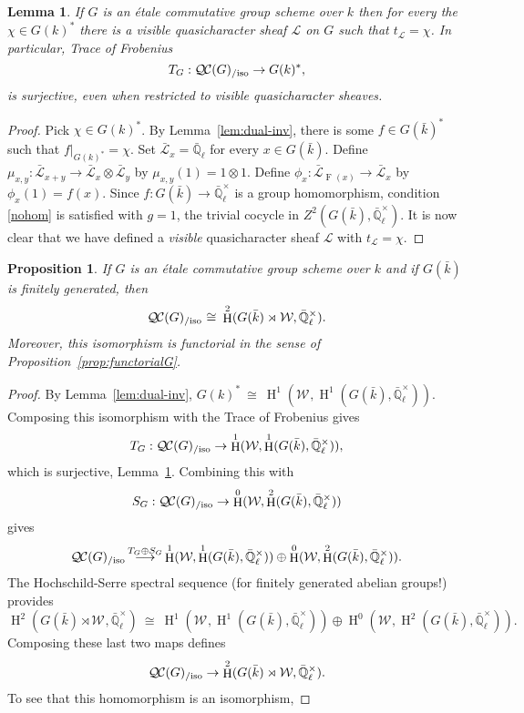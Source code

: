 \documentclass{amsart}
\theoremstyle{plain}
\newtheorem{proposition}[theorem]{Proposition}
\newtheorem{lemma}[theorem]{Lemma}
\theoremstyle{definition}
\theoremstyle{remark}
\newcommand{\EE}{\mathbb{\bar Q}_\ell}
\newcommand{\bFq}{\bar{k}}
\newcommand{\Fq}{k}
\newcommand{\EEx}{\EE^\times}
\newcommand{\Weil}[1]{\mathcal{W}_{#1}}
\newcommand{\Frob}[1]{\operatorname{F}_{#1}}
\DeclareMathOperator{\Hh}{H}
\newcommand{\iso}{{\ \cong\ }}
\newcommand{\qcs}[1]{{\mathcal{#1}}}
\newcommand{\gqcs}[1]{{\mathcal{\bar #1}}}
\newcommand{\QC}{{\mathcal{Q\hskip-0.8pt C}}}
\newcommand{\QCiso}[1]{\QC(#1)_{/\text{iso}}}
\newcommand{\trFrob}[1]{t_{#1}}
\newcommand{\TrFrob}[1]{T_{#1}}
\begin{document}
\begin{lemma}\label{lem:etale-trace}
If $G$ is an \'etale commutative group scheme over $\Fq$
then for every the $\chi \in G(\Fq)^*$ there is a visible quasicharacter sheaf $\qcs{L}$ on $G$ such that $\trFrob{\qcs{L}} = \chi$.
In particular, Trace of Frobenius
\[
\TrFrob{G} : \QCiso{G} \to G(\Fq)^*,
\]
is surjective, even when restricted to visible quasicharacter sheaves.
\end{lemma}

\begin{proof}
Pick $\chi \in G(\Fq)^*$.
By Lemma~\ref{lem:dual-inv}, there is some $f\in G(\bFq)^*$ such that $f\vert_{G(\Fq)^*} = \chi$.
Set $\gqcs{L}_x = \EE$ for every $x\in G(\bFq)$.
Define $\mu_{x,y} : \gqcs{L}_{x+y} \to \gqcs{L}_x\otimes \gqcs{L}_y$ by $\mu_{x,y}(1) = 1 \otimes 1$.
Define $\phi_{x} : \gqcs{L}_{\Frob{}(x)} \to \gqcs{L}_x$ by $\phi_{x}(1) = f(x)$.
Since $f : G(\bFq) \to \EEx$ is a group homomorphism,
condition \eqref{nohom} is satisfied with $g =1$, the trivial cocycle in $Z^2(G(\bFq),\EEx)$.
It is now clear that we have defined a \emph{visible} quasicharacter sheaf $\qcs{L}$ with $\trFrob{\qcs{L}} = \chi$.
\end{proof}


\begin{proposition} \label{prop:etale-iso}
	If $G$ is an \'etale commutative group scheme over $\Fq$
	and if $G(\bFq)$ is finitely generated,
  	then
  	\[
  	\QCiso{G} \iso \Hh^2(G(\bFq)\rtimes \Weil{}, \EEx).
  	\]
  	Moreover, this isomorphism is functorial
  	in the sense of Proposition~\ref{prop:functorialG}.
\end{proposition}

\begin{proof}
By Lemma~\ref{lem:dual-inv}, $G(\Fq)^* \iso \Hh^1(\Weil{},\Hh^1(G(\bFq),\EEx))$. Composing this isomorphism with the Trace of Frobenius gives
\[
T_{G}: \QCiso{G}\to  \Hh^1(\Weil{},\Hh^1(G(\bFq),\EEx)),
\]
which is surjective, Lemma~\ref{lem:etale-trace}.
Combining this with
\[
S_{G} : \QCiso{G} \to \Hh^0(\Weil{}, \Hh^2(G(\bFq),\EEx))
\]
gives
\[
\QCiso{G} \mathop{\longrightarrow}\limits^{T_{G}\oplus S_{G}} \Hh^1(\Weil{},\Hh^1(G(\bFq),\EEx))\oplus \Hh^0(\Weil{}, \Hh^2(G(\bFq),\EEx)).
\]
The Hochschild-Serre spectral sequence (for finitely generated abelian groups!) provides
\[
\Hh^2(G(\bFq)\rtimes \Weil{},\EEx)  \iso \Hh^1(\Weil{}, \Hh^1(G(\bFq),\EEx)) \oplus \Hh^0(\Weil{}, \Hh^2(G(\bFq),\EEx)).
\]
Composing these last two maps defines
\begin{equation}
\QCiso{G}\to \Hh^2(G(\bFq)\rtimes \Weil{},\EEx).
\end{equation}
To see that this homomorphism is an isomorphism,
\end{proof}
\end{document}
